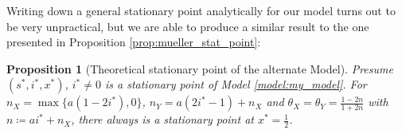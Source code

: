 \documentclass[12pt,a4paper,twoside]{article}
\newtheorem{prop}{Proposition}[section]
\begin{document}
Writing down a general stationary point analytically for our model turns out to be very unpractical, but we are able to produce a similar result to the one presented in Proposition \ref{prop:mueller_stat_point}:
\begin{prop}[Theoretical stationary point of the alternate Model]\label{prop:theor_stat_point_my_model}\phantom{lel}\newline
	Presume $\left(s^*, i^*, x^*\right)$, $i^* \neq 0$ is a stationary point of Model \ref{model:my_model}. \newline
	For $n_X = \max \lbrace a\left(1-2i^*\right), 0\rbrace$, $n_Y = a\left(2i^* - 1\right) + n_X$ and $\theta_X = \theta_Y = \frac{1-2n}{1+2n}$ with\newline $n \coloneqq ai^* + n_X$, there always is a stationary point at $x^* = \frac{1}{2}$.%
\end{prop} 
\end{document}
